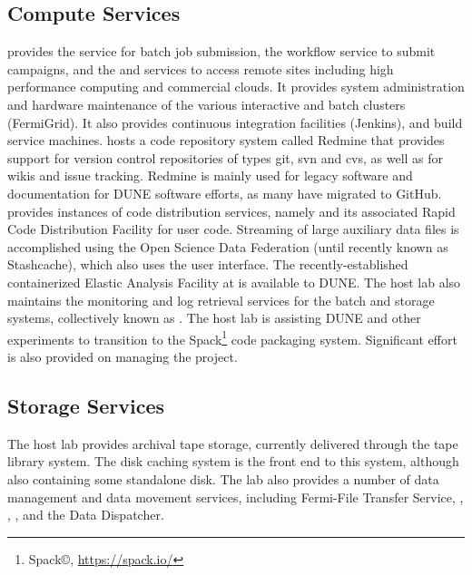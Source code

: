 \documentclass[../main-v1.tex]{subfiles}
\begin{document}

\subsection{Compute Services}
 provides the  service for batch job submission, the  workflow service to submit campaigns, and the 
and  services to access remote sites including high performance computing and commercial clouds. It provides system administration and hardware maintenance of the various interactive and batch clusters (FermiGrid).  It also provides
continuous integration facilities (Jenkins), and build service machines.    hosts a code repository system called Redmine that provides support for version control repositories of types git, svn and cvs, as well as for wikis and issue tracking.  Redmine is mainly used for legacy software and documentation for DUNE software efforts, as many have migrated to GitHub.    provides instances of code distribution services, namely  and its associated Rapid Code Distribution Facility for user code.  Streaming of large auxiliary data files is accomplished using the Open Science Data Federation (until recently known as 
Stashcache), which also uses the  user interface. 
The recently-established containerized Elastic Analysis Facility at   is available to DUNE.  The host lab also maintains
the monitoring and log retrieval services for the batch and storage systems, collectively known as . 
 The host lab is assisting DUNE and other experiments to transition to the Spack\footnote{Spack\copyright, \url{https://spack.io/}} code packaging system.  Significant effort is also provided on managing the  project.

\subsection{Storage Services}
The host lab provides archival tape storage, currently delivered through the  tape library system.  The  
disk caching system is the front end to this system, although also containing some standalone disk.  The lab also provides a number of data management and data movement services, including Fermi-File Transfer Service, , , , and the Data Dispatcher. 
\end{document}
